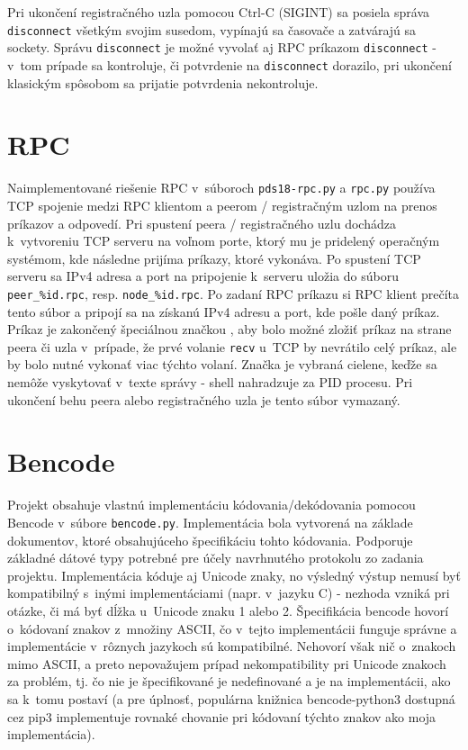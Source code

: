 Pri ukončení registračného uzla pomocou  Ctrl-C (SIGINT) sa posiela správa \texttt{disconnect} všetkým svojim susedom, vypínajú sa časovače a zatvárajú sa sockety. Správu \texttt{disconnect} je možné vyvolať aj RPC príkazom \texttt{disconnect} \-- v~tom prípade sa kontroluje, či potvrdenie na \texttt{disconnect} dorazilo, pri ukončení klasickým spôsobom sa prijatie potvrdenia nekontroluje.

\section{RPC}

Naimplementované riešenie RPC v~súboroch \texttt{pds18-rpc.py} a \texttt{rpc.py} používa TCP spojenie medzi RPC klientom a peerom / registračným uzlom na prenos príkazov a odpovedí. Pri spustení peera / registračného uzlu dochádza k~vytvoreniu TCP serveru na voľnom porte, ktorý mu je pridelený operačným systémom, kde následne prijíma príkazy, ktoré vykonáva. Po spustení TCP serveru sa IPv4 adresa a port na pripojenie k~serveru uložia do súboru \texttt{peer\_\%id.rpc}, resp. \texttt{node\_\%id.rpc}. Po zadaní RPC príkazu si RPC klient prečíta tento súbor a pripojí sa na získanú IPv4 adresu a port, kde pošle daný príkaz. Príkaz je zakončený špeciálnou značkou \uv{\$\$}, aby bolo možné zložiť príkaz na strane peera či uzla v~prípade, že prvé volanie \texttt{recv} u~TCP by nevrátilo celý príkaz, ale by bolo nutné vykonať viac týchto volaní. Značka \uv{\$\$} je vybraná cielene, keďže sa nemôže vyskytovať v~texte správy \-- shell nahradzuje \uv{\$\$} za PID procesu. Pri ukončení behu peera alebo registračného uzla je tento súbor vymazaný.

\section{Bencode}

Projekt obsahuje vlastnú implementáciu kódovania/dekódovania pomocou Bencode v~súbore \texttt{bencode.py}. Implementácia bola vytvorená na základe dokumentov, ktoré obsahujúceho špecifikáciu tohto kódovania. Podporuje základné dátové typy potrebné pre účely navrhnutého protokolu zo zadania projektu. Implementácia kóduje aj Unicode znaky, no výsledný výstup nemusí byť kompatibilný s~inými implementáciami (napr. v~jazyku C) \--  nezhoda vzniká pri otázke, či má byť dĺžka u~Unicode znaku 1 alebo 2. Špecifikácia bencode hovorí o~kódovaní znakov z~množiny ASCII, čo v~tejto implementácii funguje správne a implementácie v~rôznych jazykoch sú kompatibilné. Nehovorí však nič o~znakoch mimo ASCII, a preto nepovažujem prípad nekompatibility pri Unicode znakoch za problém, tj. čo nie je špecifikované je nedefinované a je na implementácii, ako sa k~tomu postaví (a pre úplnosť, populárna knižnica bencode-python3 dostupná cez pip3 implementuje rovnaké chovanie pri kódovaní týchto znakov ako moja implementácia).

